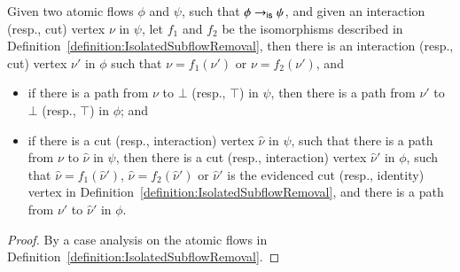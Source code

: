 \begin{lemma}\label{lemma:IsolatedSubflowRemovalPaths}
Given two atomic flows $\phi$ and $\psi$, such that $\phi\to_{\mathsf{is}}\psi$, and given an interaction (resp., cut) vertex $\nu$ in $\psi$, let $f_1$ and $f_2$ be the isomorphisms described in Definition~\ref{definition:IsolatedSubflowRemoval}, then there is an interaction (resp., cut) vertex $\nu'$ in $\phi$ such that $\nu=f_1(\nu')$ or $\nu=f_2(\nu')$, and
\begin{itemize}
\item if there is a path from $\nu$ to $\bot$ (resp., $\top$) in $\psi$, then there is a path from $\nu'$ to $\bot$ (resp., $\top$) in $\phi$; and
\item if there is a cut (resp., interaction) vertex $\hat\nu$ in $\psi$, such that there is a path from $\nu$ to $\hat\nu$ in $\psi$, then there is a cut (resp., interaction) vertex $\hat\nu'$ in $\phi$, such that $\hat\nu=f_1(\hat\nu')$, $\hat\nu=f_2(\hat\nu')$ or $\hat\nu'$ is the evidenced cut (resp., identity) vertex in Definition~\ref{definition:IsolatedSubflowRemoval}, and there is a path from $\nu'$ to $\hat\nu'$ in $\phi$.
\end{itemize}
\end{lemma}


\begin{proof}
By a case analysis on the atomic flows in Definition~\vref{definition:IsolatedSubflowRemoval}.
\end{proof}

